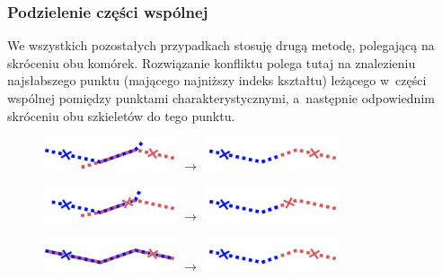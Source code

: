 \documentclass[declaration,shortabstract,mgr]{iithesis}
\begin{document}

\subsubsection{Podzielenie części wspólnej}

We wszystkich pozostałych przypadkach stosuję drugą metodę, polegającą na skróceniu obu komórek.
Rozwiązanie konfliktu polega tutaj na znalezieniu najsłabszego punktu (mającego najniższy indeks kształtu) leżącego w~części wspólnej pomiędzy punktami charakterystycznymi, a~następnie odpowiednim skróceniu obu szkieletów do tego punktu.

\begin{figure}[H]
  \centering
  \includegraphics[valign=m,width=0.35\textwidth]{images/overlap-out-out-split.png}
  $\rightarrow$
  \includegraphics[valign=m,width=0.35\textwidth]{images/overlap-out-out-split-solved.png}
\end{figure}

\begin{figure}[H]
  \centering
  \includegraphics[valign=m,width=0.35\textwidth]{images/overlap-out-in-split.png}
  $\rightarrow$
  \includegraphics[valign=m,width=0.35\textwidth]{images/overlap-out-in-split-solved.png}
\end{figure}

\begin{figure}[H]
  \centering
  \includegraphics[valign=m,width=0.35\textwidth]{images/overlap-in-in-split.png}
  $\rightarrow$
  \includegraphics[valign=m,width=0.35\textwidth]{images/overlap-in-in-split-solved.png}
\end{figure}
\end{document}
